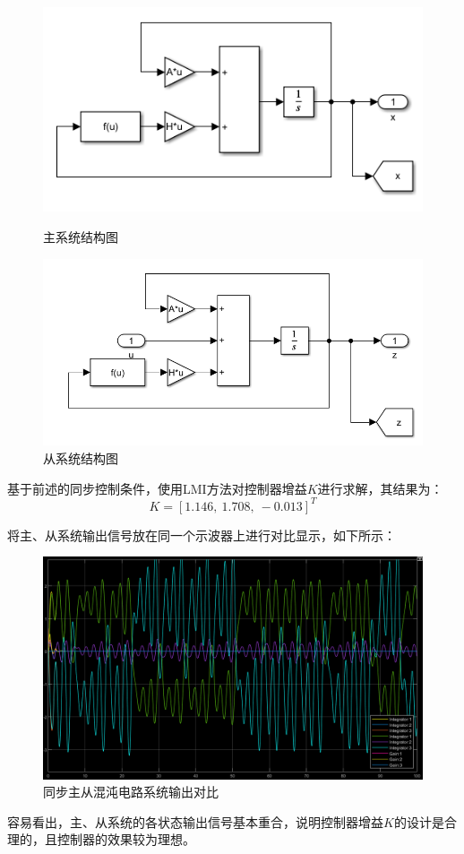 \documentclass[UTF8]{article}
\begin{document}
\begin{figure}[htbp]
	\centering
	\begin{minipage}{0.49\linewidth}
		\centering
		\includegraphics[width=0.9\linewidth]{figure/混沌电路-master.png}
		\caption{主系统结构图}
	\end{minipage}
	\begin{minipage}{0.49\linewidth}
		\centering
		\includegraphics[width=0.9\linewidth]{figure/混沌电路-slaver.png}
		\caption{从系统结构图}
	\end{minipage}
\end{figure}

基于前述的同步控制条件，使用LMI方法对控制器增益$K$进行求解，其结果为：
\begin{equation*}
	K = [1.146,\ 1.708,\ -0.013]^T
\end{equation*}

将主、从系统输出信号放在同一个示波器上进行对比显示，如下所示：
\begin{figure}[H]
    \centering %
    \includegraphics[width=.6\textwidth]{figure/混沌电路-同步-输出.png}
    \caption{同步主从混沌电路系统输出对比} %
\end{figure}
容易看出，主、从系统的各状态输出信号基本重合，说明控制器增益$K$的设计是合理的，且控制器的效果较为理想。
\end{document}
